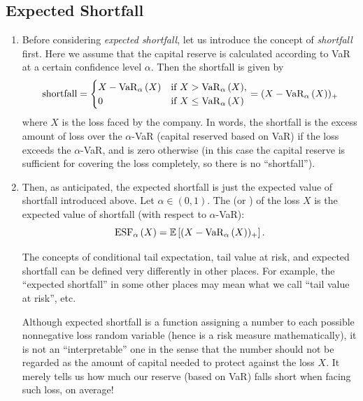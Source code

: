 \subsection{Expected Shortfall}
\begin{enumerate}
\item Before considering \emph{expected shortfall}, let us introduce the
concept of \emph{shortfall} first. Here we assume that the capital reserve is
calculated according to VaR at a certain confidence level \(\alpha\). Then the
shortfall is given by
\[
\text{shortfall}=\begin{cases}
X-\operatorname{VaR}_{\alpha}\left(X\right)&\text{if \(X>\operatorname{VaR}_{\alpha}\left(X\right)\)}, \\
0&\text{if \(X\le \operatorname{VaR}_{\alpha}\left(X\right)\)}
\end{cases}
=(X-\operatorname{VaR}_{\alpha}\left(X\right))_{+}
\]
where \(X\) is the loss faced by the company. In words, the shortfall is the
excess amount of loss over the \(\alpha\)-VaR (capital reserved based on VaR)
if the loss exceeds the \(\alpha\)-VaR, and is zero otherwise (in this case the
capital reserve is sufficient for covering the loss completely, so there is no
``shortfall'').

\item Then, as anticipated, the expected shortfall is just the expected value
of shortfall introduced above.  Let \(\alpha\in(0,1)\). The  (or ) of the
loss \(X\) is the expected value of shortfall (with respect to \(\alpha\)-VaR):
\[
\operatorname{ESF}_{\alpha}\left(X\right)=\mathbb{E}\left[(X-\operatorname{VaR}_{\alpha}\left(X\right))_{+}\right].
\]

\begin{warning}
The concepts of conditional tail expectation, tail value at risk, and expected
shortfall can be defined very differently in other places. For example, the
``expected shortfall'' in some other places may mean what we call ``tail value
at risk'', etc.
\end{warning}

Although expected shortfall is a function assigning a number to each possible
nonnegative loss random variable (hence is a risk measure mathematically), it
is not an ``interpretable'' one in the sense that the number should not be
regarded as the amount of capital needed to protect against the loss \(X\). It
merely tells us how much our reserve (based on VaR) falls short when facing
such loss, on average!


\end{enumerate}
